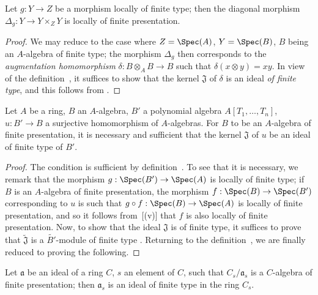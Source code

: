 \begin{corollary}[1.4.3.1]
\label{IV.1.4.3.1}
Let $g:Y\to Z$ be a morphism locally of finite type; then the diagonal morphism $\Delta_g:Y\to Y\times_Z Y$ is locally of finite presentation.
\end{corollary}

\begin{proof}
We may reduce to the case where $Z=\Spec(A)$, $Y=\Spec(B)$, $B$ being an $A$-algebra of finite type; the morphism $\Delta_g$ then corresponds to the \emph{augmentation homomorphism} $\delta:B\otimes_A B\to B$ such that $\delta(x\otimes y)=xy$.
In view of the definition~, it suffices to show that the kernel $\mathfrak{J}$ of $\delta$ is an ideal \emph{of finite type}, and this follows from .
\end{proof}

\begin{proposition}[1.4.4]
\label{IV.1.4.4}
Let $A$ be a ring, $B$ an $A$-algebra, $B'$ a polynomial algebra $A[T_1,\ldots,T_n]$, $u:B'\to B$ a surjective homomorphism of $A$-algebras.
For $B$ to be an $A$-algebra of finite presentation, it is necessary and sufficient that the kernel $\mathfrak{J}$ of $u$ be an ideal of finite type of $B'$.
\end{proposition}

\begin{proof}
The condition is sufficient by definition~.
To see that it is necessary, we remark that the morphism $g:\Spec(B')\to\Spec(A)$ is locally of finite type; if $B$ is an $A$-algebra of finite presentation, the morphism $f:\Spec(B)\to\Spec(B')$ corresponding to $u$ is such that $g\circ f:\Spec(B)\to\Spec(A)$ is locally of finite presentation, and so it follows from~[(v)] that $f$ is also locally of finite presentation.
Now, to show that the ideal $\mathfrak{J}$ is of finite type, it suffices to prove that $\widetilde{\mathfrak{J}}$ is a $\widetilde{B'}$-module of finite type .
Returning to the definition~, we are finally reduced to proving the following.
\end{proof}

\begin{lemma}[1.4.4.1]
\label{IV.1.4.4.1}
Let $\mathfrak{a}$ be an ideal of a ring $C$, $s$ an element of $C$, such that $C_s/\mathfrak{a}_s$ is a $C$-algebra of finite presentation; then $\mathfrak{a}_s$ is an ideal of finite type in the ring $C_s$.
\end{lemma}

